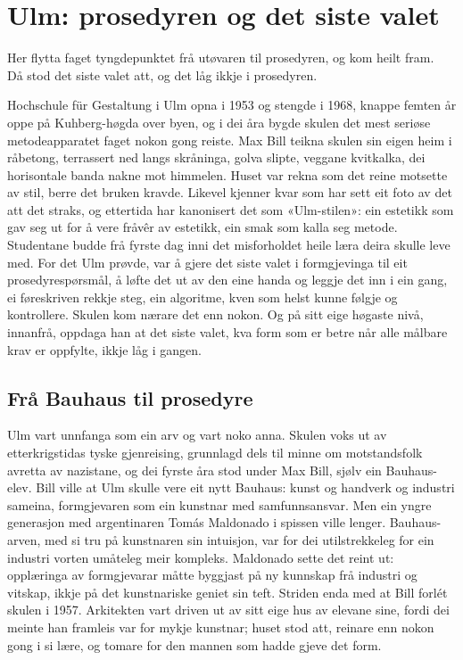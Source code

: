 \chapter{Ulm: prosedyren og det siste valet}

\begin{motto}
Her flytta faget tyngdepunktet frå utøvaren til prosedyren, og kom heilt fram.\\ Då stod det siste valet att, og det låg ikkje i prosedyren.
\end{motto}

Hochschule für Gestaltung i Ulm opna i 1953 og stengde i 1968, knappe femten år oppe på Kuhberg-høgda over byen, og i dei åra bygde skulen det mest seriøse metodeapparatet faget nokon gong reiste. Max Bill teikna skulen sin eigen heim i råbetong, terrassert ned langs skråninga, golva slipte, veggane kvitkalka, dei horisontale banda nakne mot himmelen. Huset var rekna som det reine motsette av stil, berre det bruken kravde. Likevel kjenner kvar som har sett eit foto av det att det straks, og ettertida har kanonisert det som «Ulm-stilen»: ein estetikk som gav seg ut for å vere fråvêr av estetikk, ein smak som kalla seg metode. Studentane budde frå fyrste dag inni det misforholdet heile læra deira skulle leve med. For det Ulm prøvde, var å gjere det siste valet i formgjevinga til eit prosedyrespørsmål, å løfte det ut av den eine handa og leggje det inn i ein gang, ei føreskriven rekkje steg, ein algoritme, kven som helst kunne følgje og kontrollere. Skulen kom nærare det enn nokon. Og på sitt eige høgaste nivå, innanfrå, oppdaga han at det siste valet, kva form som er betre når alle målbare krav er oppfylte, ikkje låg i gangen.


\section{Frå Bauhaus til prosedyre}

Ulm vart unnfanga som ein arv og vart noko anna. Skulen voks ut av etterkrigstidas tyske gjenreising, grunnlagd dels til minne om motstandsfolk avretta av nazistane, og dei fyrste åra stod under Max Bill, sjølv ein Bauhaus-elev. Bill ville at Ulm skulle vere eit nytt Bauhaus: kunst og handverk og industri sameina, formgjevaren som ein kunstnar med samfunnsansvar. Men ein yngre generasjon med argentinaren Tomás Maldonado i spissen ville lenger. Bauhaus-arven, med si tru på kunstnaren sin intuisjon, var for dei utilstrekkeleg for ein industri vorten umåteleg meir kompleks. Maldonado sette det reint ut: opplæringa av formgjevarar måtte byggjast på ny kunnskap frå industri og vitskap, ikkje på det kunstnariske geniet sin teft\autocite{maldonado1958}. Striden enda med at Bill forlét skulen i 1957. Arkitekten vart driven ut av sitt eige hus av elevane sine, fordi dei meinte han framleis var for mykje kunstnar; huset stod att, reinare enn nokon gong i si lære, og tomare for den mannen som hadde gjeve det form.

